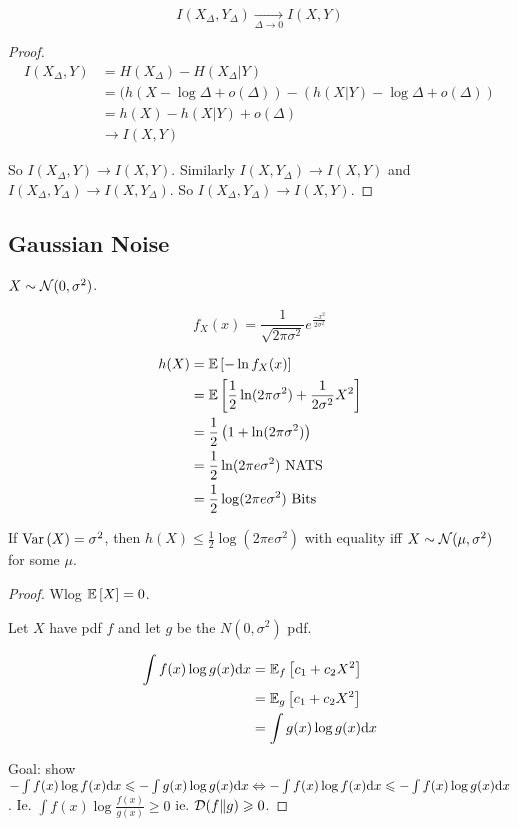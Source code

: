 \begin{theorem}
    \[
        I(X_\Delta, Y_\Delta) \underset{\Delta\to 0}{\to} I(X,Y)
    \]
\end{theorem}
\begin{proof}
    \[
        \begin{aligned}
            I(X_\Delta, Y) &= H(X_\Delta) - H(X_\Delta \vert Y)\\
            &= (h(X - \log \Delta + o(\Delta)) - (h(X\vert Y) - \log \Delta + o(\Delta))\\
            &= h(X) - h(X\vert Y) + o(\Delta)\\
            &\to I(X,Y)
        \end{aligned}
    \]
    
    So $I(X_\Delta, Y) \to I(X,Y)$. Similarly $I(X, Y_\Delta) \to I(X,Y)$ and $I(X_\Delta, Y_\Delta) \to I(X,Y_\Delta)$. So $I(X_\Delta, Y_\Delta) \to I(X,Y)$.
\end{proof}

\subsection{Gaussian Noise}

$X \sim \mathcal{N}(0,\sigma^2)$.

\[
    f_X(x) = \frac{1}{\sqrt{2\pi\sigma^2}} e^{\frac{-x^2}{2\sigma^2}}
\]

\[
    \begin{aligned}
        h(X) &= \mathbb{E}\left[ -\ln f_X(x) \right]\\
        &= \mathbb{E}\left[ \frac{1}{2} \ln(2\pi\sigma^2) + \frac{1}{2\sigma^2}X^2 \right]\\
        &= \frac{1}{2}\left( 1+\ln(2\pi\sigma^2) \right)\\
        &= \frac{1}{2} \ln(2\pi e\sigma^2)\text{ NATS}\\
        &= \frac{1}{2} \log(2\pi e\sigma^2) \text{ Bits}
    \end{aligned}
\]

\begin{theorem}
    If $\text{Var}\left( X \right) = \sigma^2$, then $h(X) \leqslant \frac{1}{2} \log (2\pi e\sigma^2)$ with equality iff $X\sim \mathcal{N}(\mu,\sigma^2)$ for some $\mu$.
\end{theorem}
\begin{proof}
    Wlog $\mathbb{E}\left[ X \right] = 0$.
    
    Let $X$ have pdf $f$ and let $g$ be the $N(0,\sigma^2)$ pdf.
    
    \[
        \begin{aligned}
            \int f(x) \log g(x) \mathrm{d} x &= \mathbb{E}_f\left[ c_1 + c_2 X^2 \right]\\
            &= \mathbb{E}_g\left[ c_1 + c_2 X^2\right]\\
            &= \int g(x) \log g(x) \mathrm{d} x
        \end{aligned}
    \]
    
    Goal: show $-\int f(x) \log f(x) \mathrm{d} x\leqslant -\int g(x) \log g(x) \mathrm{d} x \Leftrightarrow -\int f(x) \log f(x) \mathrm{d} x\leqslant -\int f(x) \log g(x) \mathrm{d} x$. Ie. $\int f(x) \log \frac{f(x)}{g(x)} \geqslant 0$ ie. $\mathcal{D}(f\Vert g) \geqslant 0$.
\end{proof}

